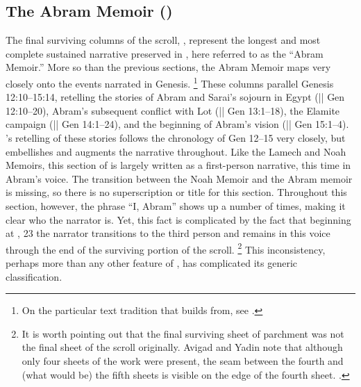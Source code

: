 \subsection{The Abram Memoir ()}

The final surviving columns of the scroll, , represent the longest and most complete sustained narrative preserved in \ga, here referred to as the ``Abram Memoir.'' More so than the previous sections, the Abram Memoir maps very closely onto the events narrated in Genesis.%
    \footnote{On the particular text tradition that \ga builds from, see \cite{vanderkam1978}.}
These columns parallel Genesis 12:10--15:14, retelling the stories of Abram and Sarai's sojourn in Egypt (|| Gen 12:10--20), Abram's subsequent conflict with Lot (|| Gen 13:1--18), the Elamite campaign (|| Gen 14:1--24), and the beginning of Abram's vision (|| Gen 15:1--4). \GA's retelling of these stories follows the chronology of Gen 12--15 very closely, but embellishes and augments the narrative throughout. Like the Lamech and Noah Memoirs, this section of \ga is largely written as a first-person narrative, this time in Abram's voice. The transition between the Noah Memoir and the Abram memoir is missing, so there is no superscription or title for this section. Throughout this section, however, the phrase ``I, Abram'' shows up a number of times, making it clear who the narrator is. Yet, this fact is complicated by the fact that beginning at , 23 the narrator transitions to the third person and remains in this voice through the end of the surviving portion of the scroll.%
    \footnote{It is worth pointing out that the final surviving sheet of parchment was not the final sheet of the scroll originally. Avigad and Yadin note that although only four sheets of the work were present, the seam between the fourth and (what would be) the fifth sheets is visible on the edge of the fourth sheet. \cite*[14]{avigad-yadin1956}.}
This inconsistency, perhaps more than any other feature of \ga, has complicated its generic classification.


